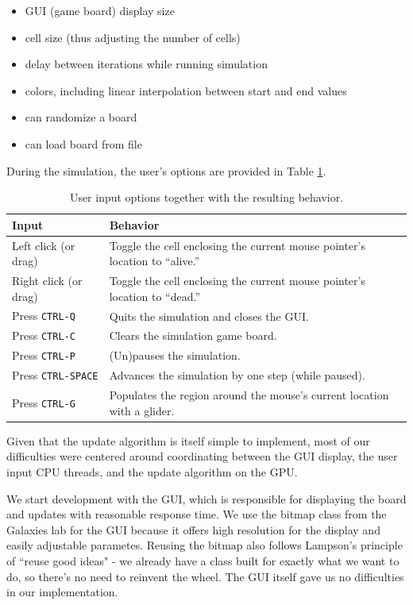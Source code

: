 \documentclass[onecolumn,12pt]{IEEEtran}
\begin{document}
  \begin{itemize}
    \item GUI (game board) display size
    \item cell size (thus adjusting the number of cells) 
    \item delay between iterations while running simulation
    \item colors, including linear interpolation between start and end values
    \item can randomize a board
    \item can load board from file
  \end{itemize} 
  During the simulation, the user's options are provided in Table
  \ref{tab:gui}.
  \begin{table}[t]
    \centering
    \begin{tabular}[b]{@{}lp{10cm}@{}} \toprule
      Input & Behavior \\ \midrule
      Left click (or drag) & Toggle the cell enclosing the current mouse
      pointer's location to ``alive.'' \\
      Right click (or drag) & Toggle the cell enclosing the current mouse
      pointer's location to ``dead.'' \\
      Press \texttt{CTRL-Q} & Quits the simulation and closes the GUI. \\
      Press \texttt{CTRL-C} & Clears the simulation game board. \\
      Press \texttt{CTRL-P} & (Un)pauses the simulation. \\
      Press \texttt{CTRL-SPACE} & Advances the simulation by one step (while
      paused). \\
      Press \texttt{CTRL-G} & Populates the region around the mouse's current
      location with a glider. \\ \bottomrule
    \end{tabular}
    \caption{User input options together with the resulting behavior.}
    \label{tab:gui}
  \end{table}
  Given that the update algorithm is itself simple to implement, most of our
  difficulties were centered around coordinating between the GUI display, the 
  user input CPU threads, and the update algorithm on the GPU.	

  We start development with the GUI, which is responsible for displaying the
  board and updates with reasonable response time. We use the bitmap class from
  the Galaxies lab for the GUI because it offers high resolution for the display
  and easily adjustable parametes. Reusing the bitmap also follows Lampson's
  principle of ``reuse good ideas" - we already have a class built for exactly
  what we want to do, so there's no need to reinvent the wheel. The GUI itself
  gave us no difficulties in our implementation. 
\end{document}
